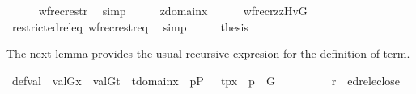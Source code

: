 \begin{isabellebody}
\ \ \ \ \isamarkupfalse%
\ wfrec{\isacharunderscore}{\kern0pt}restr\ \isamarkupfalse%
\ simp\isanewline
\ \ \isamarkupfalse%
\ \isamarkupfalse%
\ {\isacartoucheopen}z{\isasymin}domain{\isacharparenleft}{\kern0pt}x{\isacharparenright}{\kern0pt}{\isacartoucheclose}\isanewline
\ \ \isamarkupfalse%
\ {\isachardoublequoteopen}{\isachardot}{\kern0pt}{\isachardot}{\kern0pt}{\isachardot}{\kern0pt}\ {\isacharequal}{\kern0pt}\ wfrec{\isacharparenleft}{\kern0pt}{\isacharquery}{\kern0pt}r{\isacharparenleft}{\kern0pt}z{\isacharparenright}{\kern0pt}{\isacharcomma}{\kern0pt}z{\isacharcomma}{\kern0pt}Hv{\isacharparenleft}{\kern0pt}G{\isacharparenright}{\kern0pt}{\isacharparenright}{\kern0pt}{\isachardoublequoteclose}\isanewline
\ \ \ \ \isamarkupfalse%
\ restrict{\isacharunderscore}{\kern0pt}edrel{\isacharunderscore}{\kern0pt}eq\ wfrec{\isacharunderscore}{\kern0pt}restr{\isacharunderscore}{\kern0pt}eq\ \isamarkupfalse%
\ simp\isanewline
\ \ \isamarkupfalse%
\ \isamarkupfalse%
\ {\isacharquery}{\kern0pt}thesis\ \isacommand{{\isachardot}{\kern0pt}}\isamarkupfalse%
\isanewline
{}\isamarkupfalse%
%
\endisatagproof
{\isafoldproof}%
%
\isadelimproof
%
\endisadelimproof
%
\begin{isamarkuptext}%
The next lemma provides the usual recursive expresion for the definition of term.%
\end{isamarkuptext}\isamarkuptrue%
\isamarkupfalse%
\ def{\isacharunderscore}{\kern0pt}val{\isacharcolon}{\kern0pt}\ \ {\isachardoublequoteopen}val{\isacharparenleft}{\kern0pt}G{\isacharcomma}{\kern0pt}x{\isacharparenright}{\kern0pt}\ {\isacharequal}{\kern0pt}\ {\isacharbraceleft}{\kern0pt}val{\isacharparenleft}{\kern0pt}G{\isacharcomma}{\kern0pt}t{\isacharparenright}{\kern0pt}\ {\isachardot}{\kern0pt}{\isachardot}{\kern0pt}\ t{\isasymin}domain{\isacharparenleft}{\kern0pt}x{\isacharparenright}{\kern0pt}\ {\isacharcomma}{\kern0pt}\ {\isasymexists}p{\isasymin}P\ {\isachardot}{\kern0pt}\ \ {\isasymlangle}t{\isacharcomma}{\kern0pt}p{\isasymrangle}{\isasymin}x\ {\isasymand}\ p\ {\isasymin}\ G\ {\isacharbraceright}{\kern0pt}{\isachardoublequoteclose}\isanewline
%
\isadelimproof
%
\endisadelimproof
%
\isatagproof
{}\isamarkupfalse%
\ {\isacharminus}{\kern0pt}\isanewline
\ \ \isamarkupfalse%
\isanewline
\ \ \ \ {\isacharquery}{\kern0pt}r{\isacharequal}{\kern0pt}{\isachardoublequoteopen}{\isasymlambda}{\isasymtau}\ {\isachardot}{\kern0pt}\ edrel{\isacharparenleft}{\kern0pt}eclose{\isacharparenleft}{\kern0pt}{\isacharbraceleft}{\kern0pt}{\isasymtau}{\isacharbraceright}{\kern0pt}{\isacharparenright}{\kern0pt}{\isacharparenright}{\kern0pt}{\isachardoublequoteclose}\isanewline

\end{isabellebody}
